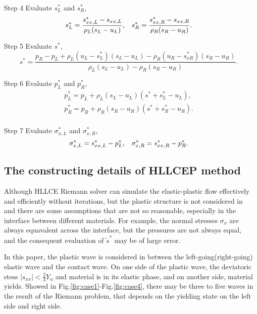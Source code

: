 \documentclass{article}
\theoremstyle{plain}\newtheorem{definition}{\sc{Definition}}
\theoremstyle{defination}\newtheorem{example}{Example}[section]
\numberwithin{equation}{section}
\numberwithin{table}{section}
\begin{document}
Step 4 Evaluate $s_L^*$ and $s_R^*$,
\begin{equation}
  s_L^* = \frac{s_{xx,L}^*-s_{xx,L}}{\rho_L(s_L-u_L)}, \hspace{0.3cm}  s_R^* = \frac{s_{xx,R}^*-s_{xx,R}}{\rho_R(s_R-u_R)}.
\end{equation}

Step 5 Evaluate $s^*$,
\begin{equation}
  s^* = \frac{p_R-p_L+\rho_L(u_L-s_L^*)(s_L-u_L)-\rho_R(u_R-s_{xR}^*)(s_R-u_R)}{\rho_L(s_L-u_L)-\rho_R(s_R-u_R)}.
\end{equation}

Step 6 Evaluate $p_L^*$ and $p_R^*$,
\begin{equation}
  \begin{aligned}
	p_L^* = p_L + \rho_L(s_L-u_L)(s^*+s_L^*-u_L),\\
	p_R^* = p_R +\rho_R(s_R-u_R)(s^*+s_{R}^*-u_R).\\
  \end{aligned}
\end{equation}

Step 7 Evaluate $\sigma_{x,L}^*$ and $\sigma_{x,R}^*$,
\begin{equation}
  \sigma_{x,L}^* = s_{xx,L}^* - p_L^*, \hspace{0.3cm} \sigma_{x,R}^* = s_{xx,R}^*- p_R^*.
\end{equation}
\subsection{The constructing details of HLLCEP method}
Although HLLCE Riemann solver can simulate the elastic-plastic flow effectively and efficiently without iterations, but the plastic structure is not considered in and  there are some assumptions that are not so reasonable, especially in the interface between different materials. For example, the normal stresses $\sigma_x$ are  always equavalent across the interface, but the pressures are not always equal, and the consequent evaluation of $\widetilde{s}^*$ may   be of large error. 

In this paper, the plastic wave is considered in between the left-going(right-going) elastic wave and the contact wave. On one side of the plastic wave, the deviatoric stess $|s_{xx}|<\frac{2}{3}Y_u$ and material is in its elastic phase, and on another side, material yields.   Showed in Fig.\ref{fig:case1}-Fig.\ref{fig:case4},  there may be three  to five waves in the result of the Riemann problem, that  depends on the  yielding state  on the left side and right side.  
\end{document}
